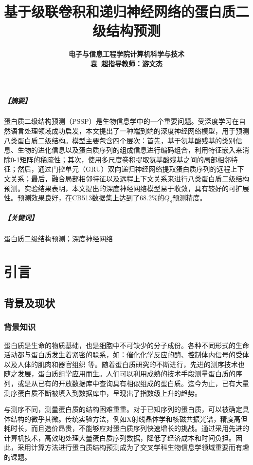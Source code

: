 \documentclass[a4paper, tikz]{article}
\title{\bfseries\xiaoerhao\hei 基于级联卷积和递归神经网络的蛋白质二级结构预测}
\author{\bfseries\xiaosihao\kai 电子与信息工程学院\qquad 计算机科学与技术\\
\xiaosihao\kai 118532014013\qquad 袁\ 超\qquad 指导教师：游文杰}
\date{}
\newcommand{\hei}{\CJKfamily{hei}}
\newcommand{\kai}{\CJKfamily{kai}}
\newcommand{\xiaowuhao}{\fontsize{9pt}{\baselineskip}\selectfont}   %
\begin{document}

\maketitle

\setlength{\parindent}{2em}

{\bfseries\xiaowuhao\kai 
\subparagraph{\hei【摘\quad 要】}蛋白质二级结构预测（PSSP）是生物信息学中的一个重要问题。受深度学习在自然语言处理领域成功启发，本文提出了一种端到端的深度神经网络模型，用于预测八类蛋白质二级结构。模型主要包含四个层次：首先，基于氨基酸残基的类别信息、生物的进化信息以及蛋白质序列的组成信息进行编码组合，利用特征嵌入来消除0-1矩阵的稀疏性；其次，使用多尺度卷积提取氨基酸残基之间的局部相邻特征；然后，通过门控单元（GRU）双向递归神经网络提取蛋白质序列的远程上下文关系；最后，融合局部相邻特征以及远程上下文关系来进行八类蛋白质二级结构预测。实验结果表明，本文提出的深度神经网络模型易于收敛，具有较好的可扩展性。预测效果良好，在CB513数据集上达到了68.2\%的$Q_8$预测精度。

\subparagraph{\hei【关键词】}蛋白质二级结构预测；深度神经网络
}
\newpage

\tableofcontents
\newpage

\section{引言}
\subsection{背景及现状}%
\subsubsection{背景知识}
蛋白质是生命的物质基础，也是细胞中不可缺少的分子成份。各种不同形式的生命活动都与蛋白质发生着紧密的联系，如：催化化学反应的酶、控制体内信号的受体以及人体的肌肉和器官组织\citep{liu2016overview} 等。随着蛋白质研究的不断进行，先进的测序技术也随之发展，蛋白质组学应用而生。人们可以利用成熟的技术手段\citep{hunt1986protein}测量蛋白质的序列，或是从已有的开放数据库中查询具有相似组成的蛋白质。迄今为止，已有大量测序蛋白质不断被填入到数据库中，呈现出了指数级上升的趋势\citep{jiang2017protein}。

与测序不同，测量蛋白质的结构困难重重。对于已知序列的蛋白质，可以被确定具体结构的微乎其微\citep{li2011novel}。传统实验方法，例如X射线晶体学和核磁共振光谱\citep{ho2012survey}，精度高但耗时长，而且造价昂贵，不能够应对蛋白质序列快速增长的挑战。通过采用先进的计算机技术，高效地处理大量蛋白质序列数据，降低了经济成本和时间负担。因此，采用计算方法进行蛋白质结构预测成为了交叉学科生物信息学领域重要而有趣的课题。
\end{document}
